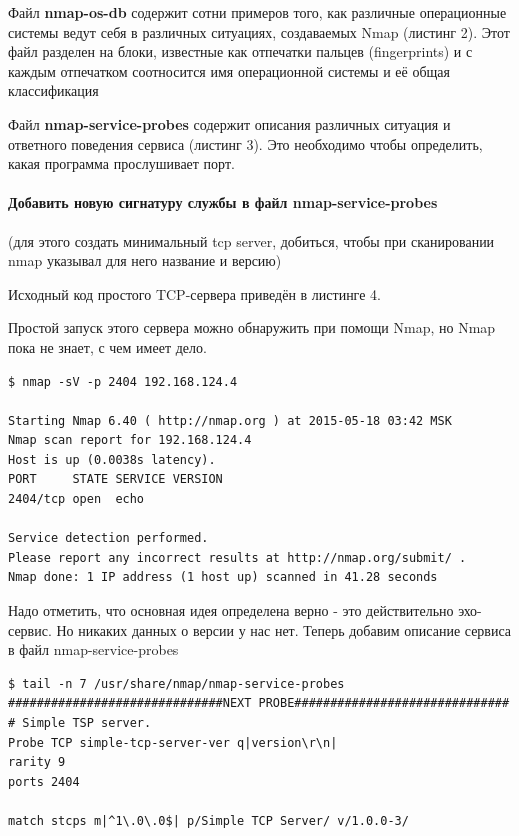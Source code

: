

Файл \textbf{nmap-os-db} содержит сотни примеров того, как различные операционные системы ведут себя в различных ситуациях, создаваемых Nmap (листинг 2). Этот файл разделен на блоки, известные как отпечатки пальцев (fingerprints) и с каждым отпечатком соотносится имя операционной системы и её общая классификация



Файл \textbf{nmap-service-probes} содержит описания различных ситуация и ответного поведения сервиса (листинг 3). Это необходимо чтобы определить, какая программа прослушивает порт.



\paragraph{Добавить новую сигнатуру службы в файл nmap-service-probes} (для этого создать минимальный tcp server, добиться, чтобы при сканировании nmap указывал для него название и версию)

Исходный код простого TCP-сервера приведён в листинге 4.



Простой запуск этого сервера можно обнаружить при помощи Nmap, но Nmap пока не знает, с чем имеет дело.

\begin{Verbatim}[frame=single]
$ nmap -sV -p 2404 192.168.124.4

Starting Nmap 6.40 ( http://nmap.org ) at 2015-05-18 03:42 MSK
Nmap scan report for 192.168.124.4
Host is up (0.0038s latency).
PORT     STATE SERVICE VERSION
2404/tcp open  echo

Service detection performed.
Please report any incorrect results at http://nmap.org/submit/ .
Nmap done: 1 IP address (1 host up) scanned in 41.28 seconds
\end{Verbatim}

Надо отметить, что основная идея определена верно - это действительно эхо-сервис. Но никаких данных о версии у нас нет. Теперь добавим описание сервиса в файл nmap-service-probes
\begin{Verbatim}[frame=single]
$ tail -n 7 /usr/share/nmap/nmap-service-probes
##############################NEXT PROBE##############################
# Simple TSP server.
Probe TCP simple-tcp-server-ver q|version\r\n|
rarity 9
ports 2404

match stcps m|^1\.0\.0$| p/Simple TCP Server/ v/1.0.0-3/
\end{Verbatim}

